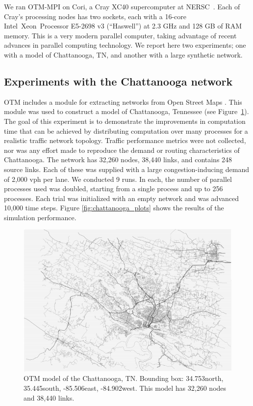 We ran OTM-MPI on Cori, a Cray XC40 supercomputer at NERSC~\cite{Cori}. Each of Cray's processing nodes has two sockets, each with a 16-core Intel\textcopyright~Xeon\texttrademark~Processor E5-2698 v3 (``Haswell'') at 2.3 GHz and 128 GB of RAM memory. This is a very modern parallel computer, taking advantage of recent advances in parallel computing technology. We report here two experiments; one with a model of Chattanooga, TN, and another with a large synthetic network. 

\subsection{Experiments with the Chattanooga network}

OTM includes a module for extracting networks from Open Street Maps \cite{otmtools,haklay2008openstreetmap}. This module was used to construct a model of  Chattanooga, Tennessee (see Figure~\ref{fig:chattanooga}). The goal of this experiment is to demonstrate the improvements in computation time that can be achieved by distributing computation over many processes for a realistic traffic network topology. Traffic performance metrics were not collected, nor was any effort made to reproduce the demand or routing characteristics of Chattanooga. The network has 32,260 nodes, 38,440 links, and contains 248 source links. Each of these was supplied with a large congestion-inducing demand of 2,000 vph per lane. We conducted 9 runs. In each, the number of parallel processes used was doubled, starting from a single process and up to 256 processes. Each trial was initialized with an empty network and was advanced 10,000 time steps. Figure \ref{fig:chattanooga_plots} shows the results of the simulation performance. 

\begin{figure}[!ht]
\centering
\includegraphics[width=\columnwidth]{figs/chattanooga.png}
\caption{OTM model of the Chattanooga, TN. Bounding box: 34.753\degree north, 35.445\degree south, -85.506\degree east, -84.902\degree west. This model has 32,260 nodes and 38,440 links. }
\label{fig:chattanooga}
\end{figure}

